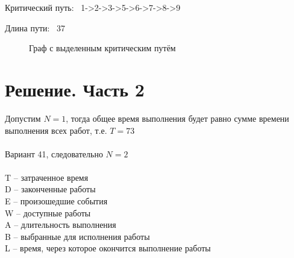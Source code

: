 \documentclass[a4paper,14pt]{extarticle}
\begin{document}
\newpage

Критический путь: \ 1->2->3->5->6->7->8->9

Длина пути: \ 37

\begin{figure}[h]
\caption{Граф с выделенным критическим путём}
\label{ris:image}
\end{figure}

\section{Решение. Часть 2}

Допустим $N = 1$, тогда общее время выполнения будет равно сумме времени выполнения всех работ, т.е. $T = 73$ \\\\
Вариант 41, следовательно $N = 2$\\\\
T -- затраченное время \\
D -- законченные работы \\
E -- произошедшие события \\
W -- доступные работы \\
A -- длительность выполнения  \\
B -- выбранные для исполнения работы \\
L -- время, через которое окончится выполнение работы
\end{document}
